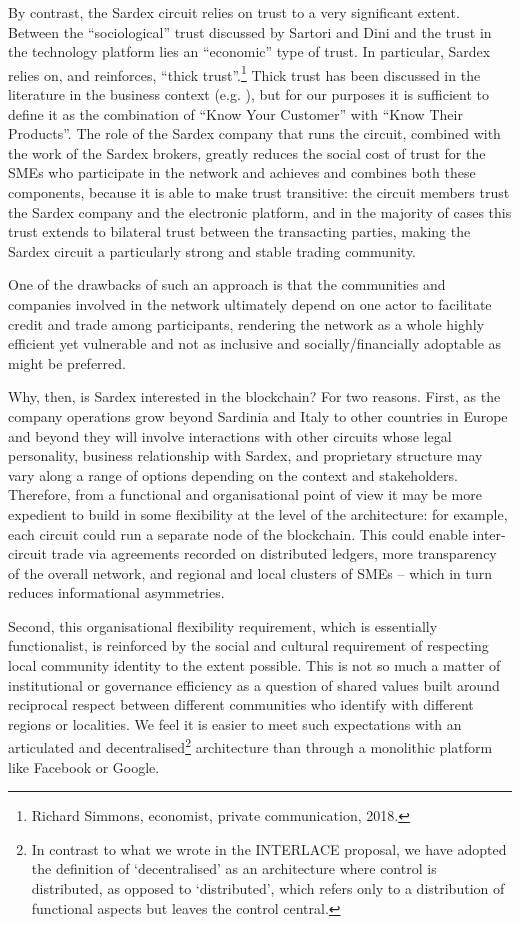 By contrast, the Sardex circuit relies on trust to a very significant extent. Between the ``sociological'' trust discussed by Sartori and Dini \cite{SartoriDini2016} and the trust in the technology platform lies an ``economic'' type of trust. In particular, Sardex relies on, and reinforces, ``thick trust''.\footnote{Richard Simmons, economist, private communication, 2018.} Thick trust has been discussed in the literature in the business context (e.g. \cite{VosselmanMeerKooistra2009}), but for our purposes it is sufficient to define it as the combination of ``Know Your Customer'' with ``Know Their Products''. The role of the Sardex company that runs the circuit, combined with the work of the Sardex brokers, greatly reduces the social cost of trust for the SMEs who participate in the network and achieves and combines both these components, because it is able to make trust transitive: the circuit members trust the Sardex company and the electronic platform, and in the majority of cases this trust extends to bilateral trust between the transacting parties, making the Sardex circuit a particularly strong and stable trading community.

One of the drawbacks of such an approach is that the communities and companies involved in the network ultimately depend on one actor to facilitate credit and trade among participants, rendering the network as a whole highly efficient yet vulnerable and not as inclusive and socially/financially adoptable as might be preferred.

Why, then, is Sardex interested in the blockchain? For two reasons. First, as the company operations grow beyond Sardinia and Italy to other countries in Europe and beyond they will involve interactions with other circuits whose legal personality, business relationship with Sardex, and proprietary structure may vary along a range of options depending on the context and stakeholders. Therefore, from a functional and organisational point of view it may be more expedient to build in some flexibility at the level of the architecture: for example, each circuit could run a separate node of the blockchain. This could enable inter-circuit trade via agreements recorded on distributed ledgers, more transparency of the overall network, and regional and local clusters of SMEs -- which in turn reduces informational asymmetries.

Second, this organisational flexibility requirement, which is essentially functionalist, is reinforced by the social and cultural requirement of respecting local community identity to the extent possible. This is not so much a matter of institutional or governance efficiency as a question of shared values built around reciprocal respect between different communities who identify with different regions or localities. We feel it is easier to meet such expectations with an articulated and decentralised\footnote{In contrast to what we wrote in the INTERLACE proposal, we have adopted the definition of `decentralised' as an architecture where control is distributed, as opposed to `distributed', which refers only to a distribution of functional aspects but leaves the control central.} architecture than through a monolithic platform like Facebook or Google.

